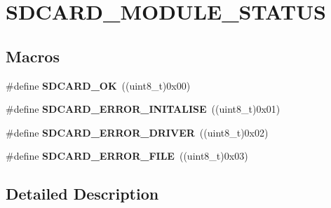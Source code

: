 \hypertarget{group___s_d_c_a_r_d___m_o_d_u_l_e___s_t_a_t_u_s}{}\section{S\+D\+C\+A\+R\+D\+\_\+\+M\+O\+D\+U\+L\+E\+\_\+\+S\+T\+A\+T\+US}
\label{group___s_d_c_a_r_d___m_o_d_u_l_e___s_t_a_t_u_s}
\subsection*{Macros}
\begin{DoxyCompactItemize}
\item 
\mbox{\label{group___s_d_c_a_r_d___m_o_d_u_l_e___s_t_a_t_u_s_gaaee936b958bde0b83776dd99397241d6}} 
\#define {\bfseries S\+D\+C\+A\+R\+D\+\_\+\+OK}~((uint8\+\_\+t)0x00)
\item 
\mbox{\label{group___s_d_c_a_r_d___m_o_d_u_l_e___s_t_a_t_u_s_ga6d1fffafdc0f39d19719c8bae95cc2a3}} 
\#define {\bfseries S\+D\+C\+A\+R\+D\+\_\+\+E\+R\+R\+O\+R\+\_\+\+I\+N\+I\+T\+A\+L\+I\+SE}~((uint8\+\_\+t)0x01)
\item 
\mbox{\label{group___s_d_c_a_r_d___m_o_d_u_l_e___s_t_a_t_u_s_ga68553e8ec35e62a56e640ac9d8eb2f4e}} 
\#define {\bfseries S\+D\+C\+A\+R\+D\+\_\+\+E\+R\+R\+O\+R\+\_\+\+D\+R\+I\+V\+ER}~((uint8\+\_\+t)0x02)
\item 
\mbox{\label{group___s_d_c_a_r_d___m_o_d_u_l_e___s_t_a_t_u_s_ga9739e3601cd4d88c5da40025af398f5f}} 
\#define {\bfseries S\+D\+C\+A\+R\+D\+\_\+\+E\+R\+R\+O\+R\+\_\+\+F\+I\+LE}~((uint8\+\_\+t)0x03)
\end{DoxyCompactItemize}


\subsection{Detailed Description}
